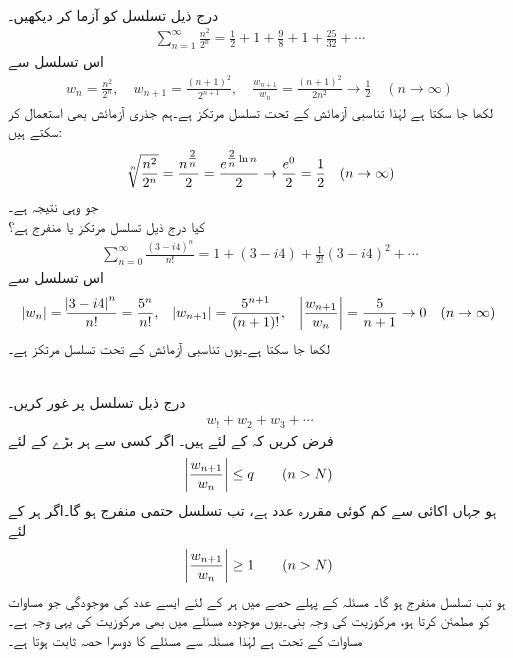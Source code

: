 \quad {}\\
درج ذیل تسلسل کو آزما کر دیکھیں۔
\begin{align*}
\sum_{n=1}^{\infty} \frac{n^2}{2^n}=\frac{1}{2}+1+\frac{9}{8}+1+\frac{25}{32}+\cdots
\end{align*}
اس تسلسل سے 
\begin{align*}
w_n=\frac{n^2}{2^n}, \quad w_{n+1}=\frac{(n+1)^2}{2^{n+1}},\quad \frac{w_{n+1}}{w_n}=\frac{(n+1)^2}{2n^2}\to \frac{1}{2}\quad (n\to\infty)
\end{align*}
لکھا جا سکتا ہے لہٰذا تناسبی آزمائش کے تحت تسلسل مرتکز ہے۔ہم جذری آزمائش بھی استعمال کر سکتے ہیں:
\begin{align*}
\sqrt[\leftroot{-2}n]{\frac{n^2}{2^n}}=\frac{n^{\tfrac{2}{n}}}{2}=\frac{e^{\tfrac{2}{n}\ln n}}{2}\to \frac{e^0}{2}=\frac{1}{2}\quad (n\to\infty)
\end{align*}
جو وہی نتیجہ ہے۔ 
\quad {}\\
کیا درج ذیل تسلسل مرتکز یا منفرج ہے؟
\begin{align*}
\sum_{n=0}^{\infty}\frac{(3-i4)^n}{n!}=1+(3-i4)+\frac{1}{2!}(3-i4)^2+\cdots
\end{align*}
اس تسلسل سے 
\begin{align*}
\abs{w_n}=\frac{\abs{3-i4}^n}{n!}=\frac{5^n}{n!}, \quad \abs{w_{n+1}}=\frac{5^{n+1}}{(n+1)!},\quad \abs{\frac{w_{n+1}}{w_n}}=\frac{5}{n+1}\to 0 \quad (n\to \infty)
\end{align*}
لکھا جا سکتا ہے۔یوں تناسبی آزمائش کے تحت تسلسل مرتکز ہے۔

\quad {}\\
درج ذیل تسلسل پر غور کریں۔
\begin{align*}
w_!+w_2+w_3+\cdots
\end{align*}
فرض کریں کہ  کے لئے  ہیں۔ اگر کسی  سے ہر بڑے  کے لئے
\begin{align}\label{مساوات_ترتیب_تناسبی_الف}
\abs{\frac{w_{n+1}}{w_n}}\le q\quad \quad (n>N)
\end{align}
ہو جہاں  اکائی سے کم کوئی مقررہ عدد ہے، تب تسلسل حتمی منفرج ہو گا۔اگر ہر  کے لئے 
\begin{align}\label{مساوات_ترتیب_تناسبی_ب}
\abs{\frac{w_{n+1}}{w_n}}\ge 1\quad \quad (n>N)
\end{align}
ہو تب تسلسل منفرج ہو گا۔
\quad
مسئلہ  کے پہلے حصے میں ہر  کے لئے ایسے عدد  کی موجودگی  جو مساوات  کو مطمئن کرتا ہو، مرکوزیت کی وجہ بنی۔یوں موجودہ مسئلے میں بھی مرکوزیت کی یہی وجہ ہے۔مساوات  کے تحت  ہے لہٰذا   مسئلہ سے مسئلے کا دوسرا حصہ ثابت ہوتا ہے۔

